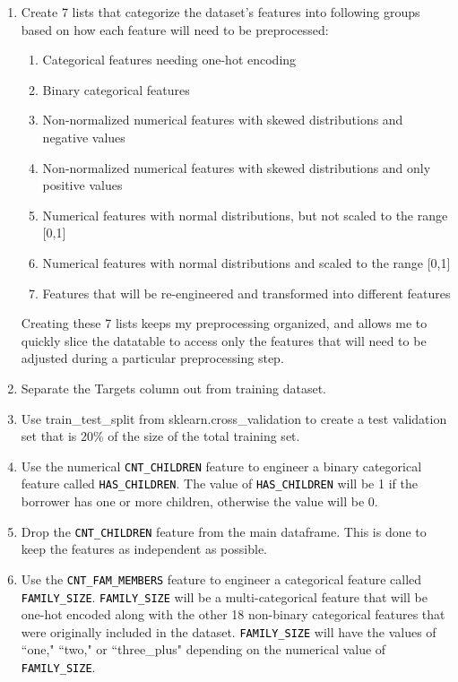 \documentclass[12pt, letterpaper]{article}
\begin{document}
\begin{enumerate}
 \item Create 7 lists that categorize the dataset's features into following groups based on how each feature will need to be preprocessed:
   \begin{enumerate}
    \item Categorical features needing one-hot encoding
    \item Binary categorical features
    \item Non-normalized numerical features with skewed distributions and negative values
    \item Non-normalized numerical features with skewed distributions and only positive values
    \item Numerical features with normal distributions, but not scaled to the range [0,1]
    \item Numerical features with normal distributions and scaled to the range [0,1]
    \item Features that will be re-engineered and transformed into different features
  \end{enumerate}
  Creating these 7 lists keeps my preprocessing organized, and allows me to quickly slice the datatable to access only the features that will need to be adjusted during a particular preprocessing step.
  \item Separate the Targets column out from training dataset.
  \item Use train_test_split from sklearn.cross_validation to create a test validation set that is 20\% of the size of the total training set.
  \item Use the numerical \colorbox{backcolor}{\textcolor{black}{\texttt{CNT_CHILDREN}}} feature to engineer a binary categorical feature called \colorbox{backcolor}{\textcolor{black}{\texttt{HAS_CHILDREN}}}. The value of \colorbox{backcolor}{\textcolor{black}{\texttt{HAS_CHILDREN}}} will be 1 if the borrower has one or more children, otherwise the value will be 0.
  \item Drop the \colorbox{backcolor}{\textcolor{black}{\texttt{CNT_CHILDREN}}} feature from the main dataframe. This is done to keep the features as independent as possible.
  \item Use the \colorbox{backcolor}{\textcolor{black}{\texttt{CNT_FAM_MEMBERS}}} feature to engineer a categorical feature called \colorbox{backcolor}{\textcolor{black}{\texttt{FAMILY_SIZE}}}. \colorbox{backcolor}{\textcolor{black}{\texttt{FAMILY_SIZE}}} will be a multi-categorical feature that will be one-hot encoded along with the other 18 non-binary categorical features that were originally included in the dataset. \colorbox{backcolor}{\textcolor{black}{\texttt{FAMILY_SIZE}}} will have the values of ``one," ``two," or ``three_plus" depending on the numerical value of \colorbox{backcolor}{\textcolor{black}{\texttt{FAMILY_SIZE}}}.

\end{enumerate}
\end{document}
